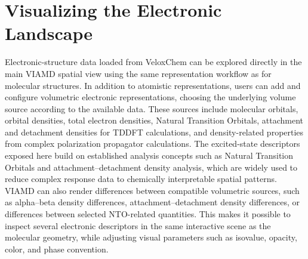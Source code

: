 \documentclass[journal=jacsat,manuscript=article]{achemso}
\begin{document}
\section{Visualizing the Electronic Landscape}
Electronic-structure data loaded from VeloxChem can be explored directly in the main VIAMD spatial view using the same representation workflow as for molecular structures. In addition to atomistic representations, users can add and configure volumetric electronic representations, choosing the underlying volume source according to the available data. These sources include molecular orbitals, orbital densities, total electron densities, Natural Transition Orbitals, attachment and detachment densities for TDDFT calculations, and density-related properties from complex polarization propagator calculations. The excited-state descriptors exposed here build on established analysis concepts such as Natural Transition Orbitals and attachment--detachment density analysis, which are widely used to reduce complex response data to chemically interpretable spatial patterns.\cite{Martin2003NTO,HeadGordon1995AttachDetach,Lu2012Multiwfn} VIAMD can also render differences between compatible volumetric sources, such as alpha--beta density differences, attachment--detachment density differences, or differences between selected NTO-related quantities. This makes it possible to inspect several electronic descriptors in the same interactive scene as the molecular geometry, while adjusting visual parameters such as isovalue, opacity, color, and phase convention.
\end{document}
